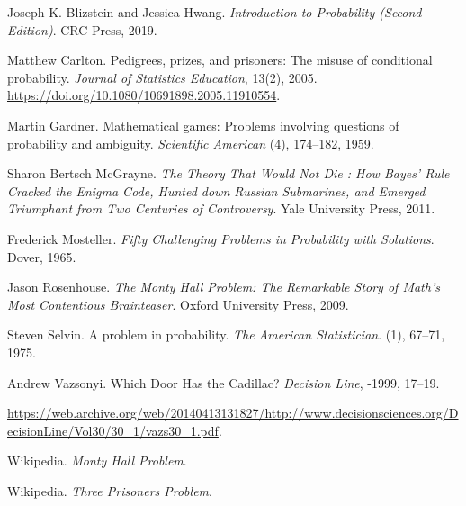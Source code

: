 \documentclass[11pt,a4paper]{article}
\begin{document}
\begin{thebibliography}{10}


Joseph K. Blizstein and Jessica Hwang.
\newblock  \textit{Introduction to Probability (Second Edition)}.
\newblock CRC Press, 2019.

Matthew Carlton.
\newblock Pedigrees, prizes, and prisoners: The misuse of conditional
  probability.
\newblock \textit{Journal of Statistics Education}, 13(2), 2005.
\newblock \url{https://doi.org/10.1080/10691898.2005.11910554}.

Martin Gardner. 
\newblock Mathematical games: Problems involving questions of probability and ambiguity. 
\newblock \textit{Scientific American}
(4), 174–182, 1959.

Sharon Bertsch McGrayne.
\newblock \textit{The Theory That Would Not Die : How Bayes' Rule Cracked the Enigma Code, Hunted down Russian Submarines, and Emerged Triumphant from Two Centuries of Controversy}.
\newblock Yale University Press, 2011.

Frederick Mosteller.
\newblock \textit{Fifty Challenging Problems in Probability with Solutions}.
\newblock Dover, 1965.

Jason Rosenhouse.
\newblock  \textit{The Monty Hall Problem: The Remarkable Story of Math's Most Contentious Brainteaser}.
\newblock Oxford University Press, 2009.

Steven Selvin. 
\newblock A problem in probability.
\newblock \textit{The American Statistician}.
(1), 67–71, 1975.

Andrew Vazsonyi.
\newblock Which Door Has the Cadillac?
\newblock \textit{Decision Line},
-1999, 17–19.
\newblock \par\noindent\url{https://web.archive.org/web/20140413131827/http://www.decisionsciences.org/DecisionLine/Vol30/30_1/vazs30_1.pdf}.

Wikipedia.
\newblock \textit{Monty Hall Problem}.

Wikipedia.
\newblock \textit{Three Prisoners Problem}.

\end{thebibliography}
\end{document}
